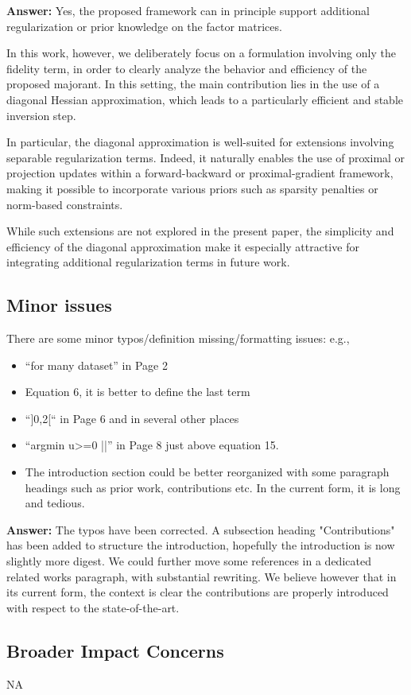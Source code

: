 \documentclass[10pt]{article} %
\newcommand{\answer}[1]{{\textbf{Answer:} \color{blue} #1}}
\begin{document}
\answer{Yes, the proposed framework can in principle support additional regularization or prior knowledge on the factor matrices.

In this work, however, we deliberately focus on a formulation involving only the fidelity term, in order to clearly analyze the behavior and efficiency of the proposed majorant. In this setting, the main contribution lies in the use of a diagonal Hessian approximation, which leads to a particularly efficient and stable inversion step.
 
In particular, the diagonal approximation is well-suited for extensions involving separable regularization terms. Indeed, it naturally enables the use of proximal or projection updates within a forward-backward or proximal-gradient framework, making it possible to incorporate various priors such as sparsity penalties or norm-based constraints.

While such extensions are not explored in the present paper, the simplicity and efficiency of the diagonal approximation make it especially attractive for integrating additional regularization terms in future work.}

\subsection{Minor issues} 
There are some minor typos/definition missing/formatting issues: e.g.,

\begin{itemize}
    \item “for many dataset” in Page 2
    \item Equation 6, it is better to define the last term
    \item “]0,2[“ in Page 6 and in several other places
    \item “argmin u>=0 ||” in Page 8 just above equation 15.
    \item The introduction section could be better reorganized with some paragraph headings such as prior work, contributions etc. In the current form, it is long and tedious.
\end{itemize}

\answer{The typos have been corrected. A subsection heading "Contributions" has been added to structure the introduction, hopefully the introduction is now slightly more digest. We could further move some references in a dedicated related works paragraph, with substantial rewriting. We believe however that in its current form, the context is clear the contributions are properly introduced with respect to the state-of-the-art.}

\subsection{Broader Impact Concerns}
NA




\end{document}
